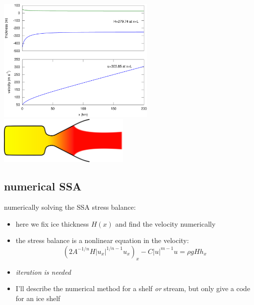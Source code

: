 \documentclass[titlepage,letterpaper,final,11pt]{scrartcl}
\newcommand{\alert}[1]{\emph{#1}}
\begin{document}
\begin{center}
  \includegraphics[width=3.0in]{steadyshelf} \hfill \includegraphics[width=2.5in]{Rocket_nozzle_expansion}
\end{center}


\subsection{numerical SSA}

numerically solving the SSA stress balance:
\begin{itemize}
\item here we fix ice thickness $H(x)$ and find the velocity numerically
\item the stress balance is a nonlinear equation in the velocity:
  $$\left(2 A^{-1/n} H |u_x|^{1/n - 1} u_x\right)_x - C|u|^{m-1}u = \rho g H h_x$$
\item \alert{iteration is needed}
\item I'll describe the numerical method for a shelf \emph{or} stream, but only give a code for an ice shelf
\end{itemize}
\end{document}
